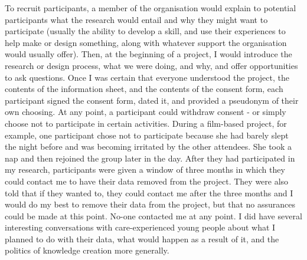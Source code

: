 To recruit participants, a member of the organisation would explain to potential participants what the research would entail and why they might want to participate (usually the ability to develop a skill, and use their experiences to help make or design something, along with whatever support the organisation would usually offer). Then, at the beginning of a project, I would introduce the research or design process, what we were doing, and why, and offer opportunities to ask questions. Once I was certain that everyone understood the project, the contents of the information sheet, and the contents of the consent form, each participant signed the consent form, dated it, and provided a pseudonym of their own choosing. At any point, a participant could withdraw consent - or simply choose not to participate in certain activities. During a film-based project, for example, one participant chose not to participate because she had barely slept the night before and was becoming irritated by the other attendees. She took a nap and then rejoined the group later in the day. After they had participated in my research, participants were given a window of three months in which they could contact me to have their data removed from the project. They were also told that if they wanted to, they could contact me after the three months and I would do my best to remove their data from the project, but that no assurances could be made at this point. No-one contacted me at any point. I did have several interesting conversations with care-experienced young people about what I planned to do with their data, what would happen as a result of it, and the politics of knowledge creation more generally.

